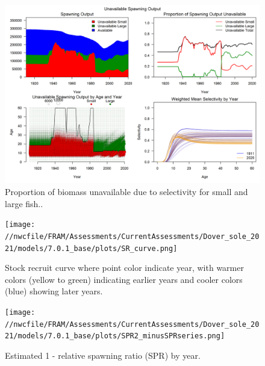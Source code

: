 \documentclass[11pt,
  english,
  a4paper,
]{article}
\begin{document}

\begin{figure}
\centering
\includegraphics[width=1\textwidth,height=1\textheight]{figs/unavailable_biomass.png}
\caption{Proportion of biomass unavailable due to selectivity for small and large fish..\label{fig:unavail-bio}}
\end{figure}

\tagmcend\tagstructend


\begin{figure}
\centering
\texttt{[image: //nwcfile/FRAM/Assessments/CurrentAssessments/Dover\_sole\_2021/models/7.0.1\_base/plots/SR\_curve.png]}
\caption{Stock recruit curve where point color indicate year, with warmer colors (yellow to green) indicating earlier years and cooler colors (blue) showing later years.\label{fig:sr-curve}}
\end{figure}

\tagmcend\tagstructend


\begin{figure}
\centering
\texttt{[image: //nwcfile/FRAM/Assessments/CurrentAssessments/Dover\_sole\_2021/models/7.0.1\_base/plots/SPR2\_minusSPRseries.png]}
\caption{Estimated 1 - relative spawning ratio (SPR) by year.\label{fig:1-spr}}
\end{figure}
\end{document}
